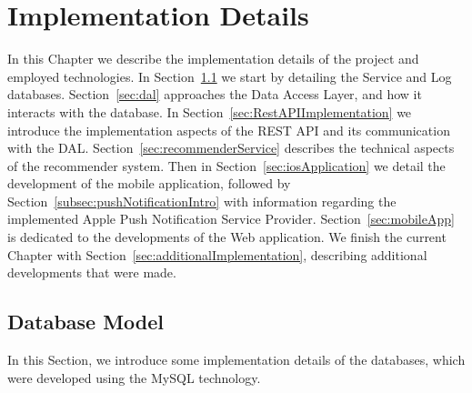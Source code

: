\chapter{Implementation Details}
\label{developed-work}
In this Chapter we describe the implementation details of the project and employed technologies. In Section~\ref{sec:DataBaseModel} we start by detailing the Service and Log databases. Section~\ref{sec:dal} approaches the Data Access Layer, and how it interacts with the database. In Section~\ref{sec:RestAPIImplementation} we introduce the implementation aspects of the REST API and its communication with the DAL. Section~\ref{sec:recommenderService} describes the technical aspects of the recommender system. Then in Section~\ref{sec:iosApplication} we detail the development of the mobile application, followed by Section~\ref{subsec:pushNotificationIntro} with information regarding the implemented Apple Push Notification Service Provider. Section~\ref{sec:mobileApp} is dedicated to the developments of the Web application. We finish the current Chapter with Section~\ref{sec:additionalImplementation}, describing additional developments that were made.

\section{Database Model}
\label{sec:DataBaseModel}
In this Section, we introduce some implementation details of the databases, which were developed using the MySQL technology.


